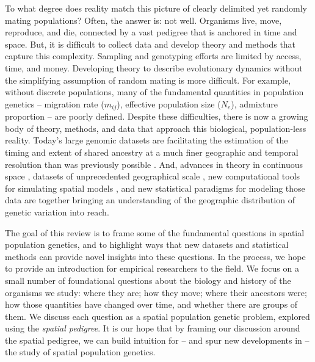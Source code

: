 \documentclass{ar-1col}
\renewcommand{\emph}[1]{{\textit{#1}}}
\begin{document}
To what degree does reality match this picture
of clearly delimited yet randomly mating populations?
Often, the answer is: not well.
Organisms live, move, reproduce, and die,
connected by a vast pedigree that is anchored in time and space.
But, it is difficult to collect data and develop theory and methods
that capture this complexity.
Sampling and genotyping efforts are limited by access, time, and money.
Developing theory to describe evolutionary dynamics
without the simplifying assumption of random mating
is more difficult.
For example, without discrete populations,
many of the fundamental quantities in population genetics -- 
migration rate ($m_{ij}$), 
effective population size ($N_e$),
admixture proportion
--
are poorly defined.
Despite these difficulties,
there is now a growing body of theory, methods, and data
that approach this biological, population-less reality.
Today's large genomic datasets
are facilitating the estimation of the timing and extent of shared ancestry 
at a much finer geographic and temporal resolution than was previously possible
\citep{Li_Durbin2011,Palamara_2012,Harris_Nielsen_2013,ralph2013geography}.
And, advances in theory in continuous space 
\citep{felsenstein1975pain,BartonWilson1995,barton-depaulis-etheridge, barton2010modelling, barton2010newmodel, Barton2013},
datasets of unprecedented geographical scale
\citep[e.g.,][]{POBI, Aguillon2017deconstructing, Shaffer195743},
new computational tools for simulating spatial models \citep{haller2018forward,haller2018treesequence},
and new statistical paradigms for modeling those data 
\citep{petkova2016visualizing, ringbauer2017inferring, ringbauer2018estimating, conStruct, alasadi2018estimating}
are together bringing an understanding of the geographic distribution of genetic variation into reach.

The goal of this review
is to frame some of the fundamental questions in spatial population genetics,
and to highlight ways that new datasets and statistical methods 
can provide novel insights into these questions.
In the process, 
we hope to provide an introduction for empirical researchers
to the field.
We focus on a small number of foundational questions 
about the biology and history of the organisms we study:
where they are; how they move; where their ancestors were;
how those quantities have changed over time, 
and whether there are groups of them.
We discuss each question
as a spatial population genetic problem, 
explored using the \emph{spatial pedigree}.
It is our hope that by framing our discussion around the spatial pedigree, 
we can build intuition for --
and spur new developments in --
the study of spatial population genetics.
\end{document}
